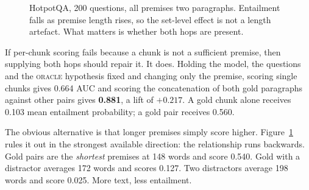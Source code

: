 \documentclass[conference]{IEEEtran}
\begin{document}
\begin{figure}[t]
\centering
{}
\caption{HotpotQA, 200 questions, all premises two paragraphs. Entailment falls
as premise length rises, so the set-level effect is not a length artefact. What
matters is whether both hops are present.}
\label{fig:length}
\end{figure}

If per-chunk scoring fails because a chunk is not a sufficient premise, then
supplying both hops should repair it. It does. Holding the model, the questions
and the \textsc{oracle} hypothesis fixed and changing only the premise, scoring
single chunks gives 0.664 AUC and scoring the concatenation of both gold
paragraphs against other pairs gives \textbf{0.881}, a lift of $+0.217$. A gold
chunk alone receives 0.103 mean entailment probability; a gold pair receives
0.560.

The obvious alternative is that longer premises simply score higher.
Figure~\ref{fig:length} rules it out in the strongest available direction: the
relationship runs backwards. Gold pairs are the \emph{shortest} premises at 148
words and score 0.540. Gold with a distractor averages 172 words and scores
0.127. Two distractors average 198 words and score 0.025. More text, less
entailment.
\end{document}
